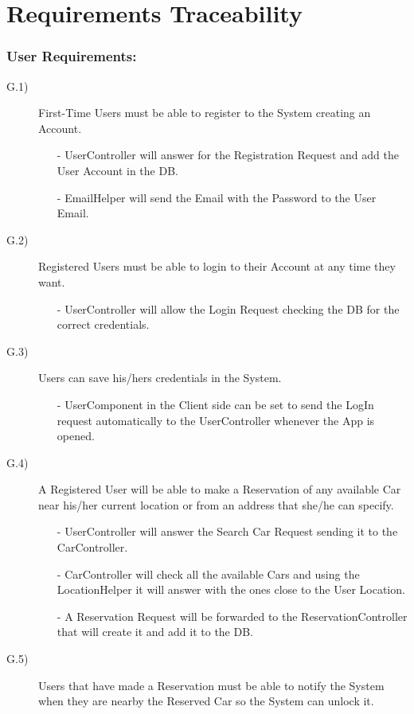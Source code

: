 \documentclass[a4paper]{article}
\begin{document}
\newpage
\section{Requirements Traceability}
\subsubsection{\textbf{User Requirements:}}
\begin{description}
\item [G.1)]First-Time Users must be able to register to the System creating an Account. 
\begin{itemize}
	\item[-]UserController will answer for the Registration Request and add the User Account in the DB.
	\item[-]EmailHelper will send the Email with the Password to the User Email.
\end{itemize}
\item [G.2)]Registered Users must be able to login to their Account at any time they want.
\begin{itemize}
	\item[-]UserController will allow the Login Request checking the DB for the correct credentials.
\end{itemize}
\item [G.3)]Users can save his/hers credentials in the System.
\begin{itemize}
	\item[-]UserComponent in the Client side can be set to send the LogIn request automatically to the UserController whenever the App is opened.
\end{itemize}
\item [G.4)]A Registered User will be able to make a Reservation of any available Car near his/her current location or from an address that she/he can specify.
\begin{itemize}
	\item[-]UserController will answer the Search Car Request sending it to the CarController.
	\item[-]CarController will check all the available Cars and using the LocationHelper it will answer with the ones close to the User Location.
	\item[-]A Reservation Request will be forwarded to the ReservationController that will create it and add it to the DB.
\end{itemize}
\item [G.5)]Users that have made a Reservation must be able to notify the System when they are nearby the Reserved Car so the System can unlock it.

\end{description}
\end{document}
